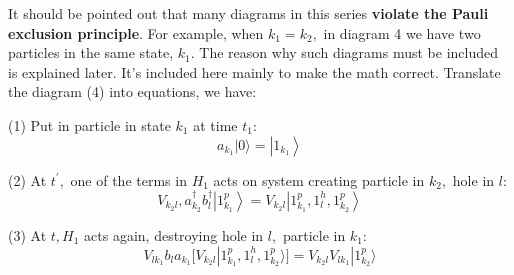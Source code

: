 It should be pointed out that many diagrams in this series \textbf{violate the Pauli exclusion principle}. For example, when $k_{1}=k_{2},$ in diagram 4 we have two particles in the same state, $k_{1}$. The reason why such diagrams must be included is explained later. It's included here mainly to make the math correct. Translate the diagram (4) into equations, we have:

(1) Put in particle in state $k_1$ at time $t_1$:
$$a_{k_{1}}|0\rangle=\left|1_{k_{1}}\right\rangle$$

(2) At $t^{\prime},$ one of the terms in $H_{1}$ acts on system creating particle in $k_{2},$ hole in $l:$
$$V_{k_{2}l}, a^{\dagger}_{k_{2}} b_{l}^{\dagger}\left|1^p_{k_1}\right\rangle=V_{k_{2}l} \left| 1^p_{k_{1}}, 1^h_l, 1^p_{k_2}\right\rangle$$

(3) At $t, H_{1}$ acts again, destroying hole in $l,$ particle in $k_{1}$:
$$
V_{lk_1}b_la_{k_1}[V_{k_2l}| 1^p_{k_{1}}, 1^h_l, 1^p_{k_2}\rangle]=V_{k_2l}V_{lk_1}|1^p_{k_2}\rangle
$$

